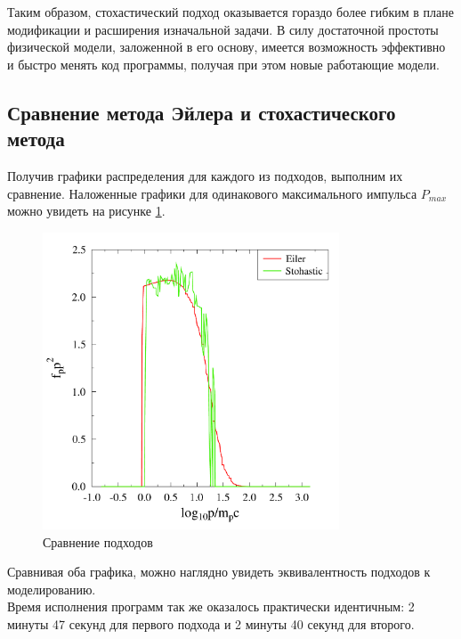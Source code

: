 \documentclass[a4paper,14pt]{extarticle} %
\begin{document}
Таким образом, стохастический подход оказывается гораздо более гибким в плане модификации и расширения изначальной задачи. В силу достаточной простоты физической модели, заложенной в его основу, имеется возможность эффективно и быстро менять код программы, получая при этом новые работающие модели.
\subsection{Сравнение метода Эйлера и стохастического метода}

Получив графики распределения для каждого из подходов, выполним их сравнение. Наложенные графики для одинакового максимального импульса $P_{max}$ можно увидеть на рисунке \ref{res/comp}. 
\begin{figure}[H]
\centering
\includegraphics[width=250pt]{compare}
\caption{Сравнение подходов}
\label{res/comp}
\end{figure}
Сравнивая оба графика, можно наглядно увидеть эквивалентность подходов к моделированию.\\

Время исполнения программ так же оказалось практически идентичным: 2 минуты 47 секунд для первого подхода и 2 минуты 40 секунд для второго.
\end{document}
